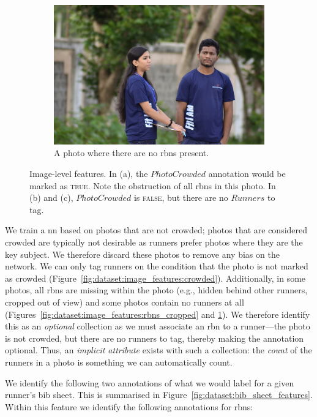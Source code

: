 \begin{figure}[th]
\begin{subfigure}[b]{0.4\textwidth}
    \includegraphics[width=\textwidth]{images/dataset/ImageFeatures_Optional_NoRBNs}
    \caption{\footnotesize A photo where there are no \glspl{rbn} present.}
    \label{fig:dataset:image_features:no_rbns}
  \end{subfigure} 
  \caption[Various image-level features]{Image-level features. In (a), the $PhotoCrowded$ annotation would be marked as \textsc{true}. Note the obstruction of all \glspl{rbn} in this photo. In (b) and (c), $PhotoCrowded$ is \textsc{false}, but there are no $Runners$ to tag.}
  \label{fig:dataset:image_features}
\end{figure}

We train a \gls{nn} based on photos that are not crowded; photos that are considered crowded are typically not desirable as runners prefer photos where they are the key subject. We therefore discard these photos to remove any bias on the network. We can only tag runners on the condition that the photo is not marked as crowded (Figure~\ref{fig:dataset:image_features:crowded}). Additionally, in some photos, all \glspl{rbn} are missing within the photo (e.g., hidden behind other runners, cropped out of view) and some photos contain no runners at all (Figures~\ref{fig:dataset:image_features:rbns_cropped} and \ref{fig:dataset:image_features:no_rbns}). We therefore identify this as an \textit{optional} collection as we must associate an \gls{rbn} to a runner---the photo is not crowded, but there are no runners to tag, thereby making the annotation optional. Thus, an \textit{implicit attribute} exists with such a collection: the \textit{count} of the runners in a photo is something we can automatically count.

We identify the following two annotations of what we would label for a given runner's bib sheet. This is summarised in Figure~\ref{fig:dataset:bib_sheet_features}. Within this feature we identify the following annotations for \glspl{rbn}:

